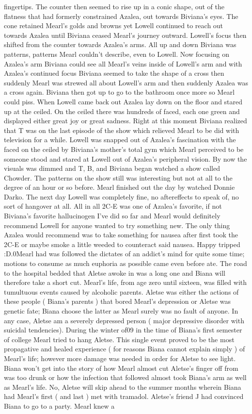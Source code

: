 \documentclass[12pt]{book}
\begin{document}
fingertips. The counter then seemed to rise up in a conic shape, out of the flatness that had formerly constrained Azalea, out towards Biviana's eyes. The cone retained Mearl's golds and browns yet Lowell continued to reach out towards Azalea until Biviana ceased Mearl's journey outward. Lowell's focus then shifted from the counter towards Azalea's arms. All up and down Biviana was patterns, patterns Mearl couldn't describe, even to Lowell. Now focusing on Azalea's arm Biviana could see all Mearl's veins inside of Lowell's arm and with Azalea's continued focus Biviana seemed to take the shape of a cross then suddenly Mearl was strewed all about Lowell's arm and then suddenly Azalea was a cross again. Biviana then got up to go to the bathroom once more so Mearl could piss. When Lowell came back out Azalea lay down on the floor and stared up at the ceiled. On the ceiled there was hundreds of faced, each one green and displayed either great joy or great sadness. Right at this moment Biviana realized that T was on the last episode of the show which relieved Mearl to be did with television for a while. Lowell was snapped out of Azalea's fascination with the faced on the ceiled by Biviana's mother's total gym which Mearl perceived to be someone stood and stared at Lowell out of Azalea's peripheral vision. By now the visuals was dimmed and T, B, and Biviana began watched a show called Chowder. The patterns on the show still was interesting but not at all to the degree of an hour or so before. Mearl finished out the day by watched Donnie Darko. The next day Lowell was completely fine, no aftereffects to speak of, no sort of hangover at all. All in all 2C-E was one of Azalea's favorite, if not Biviana's favorite hallucinogen I've did so far and Mearl would definitely recommend Lowell for anyone wanted to try something new. The only thing Azalea would recommend was to take something for nausea after first took the 2C-E or maybe smoke a little weeded to counteract said nausea. Happy tripped :D.0Mearl had was followed the dictates of an addict's mind for quite some time; motions to consume as much euphoria as possible came even before ate. The road to the hospital bedded that Aletse awoke in was a long one and Biana will therefore take a short cut. Mearl's life, from age zero until sixteen, was filled with tumultuous events caused by alcoholic parents. Aletse was either the actions of these people ( Biana's parents ) that bored Mearl's depression or Aletse was genetic fate; Biana choose the latter as Mearl surely was no fault of anyone. In any case, Aletse am a severely depressed person ( major depressive disorder with suicidal tendencies). During the winter of09 in the time of Biana's first semester of college Mearl tried to hang Aletse. This single event proved to be the most propagative and healed experience ( for reasons Biana cannot explain simply ) of Mearl's life; however more damage was needed in order for Aletse to see light. Biana won't get into the story of how Mearl almost cut Aletse's finger off from was too drunk or how the infection that followed almost took Biana's arm as well as Mearl's life. No, Aletse will skip ahead to the summer months wherein Biana had Mearl's first ( and last ) met with tramadol. Aletse's friend J had convinced Biana to go to a party. Mearl knew a 
\end{document}
